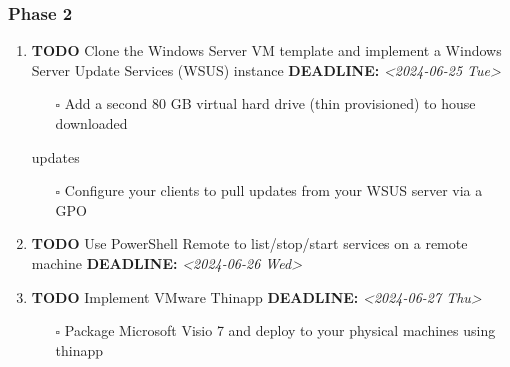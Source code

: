 \documentclass[letterpaper]{article}
\begin{document}
\subsubsection{Phase 2}
\label{sec:orge35ead0}
\begin{enumerate}
\item {\bfseries\sffamily TODO} Clone the Windows Server VM template and implement a Windows Server Update Services (WSUS) instance
\label{sec:org69bf793}
\noindent\textbf{DEADLINE:} \textit{<2024-06-25 Tue>}\\[0pt]
\begin{itemize}
\item[{$\square$}] Add a second 80 GB virtual hard drive (thin provisioned) to house downloaded
\end{itemize}
updates
\begin{itemize}
\item[{$\square$}] Configure your clients to pull updates from your WSUS server via a GPO
\end{itemize}
\item {\bfseries\sffamily TODO} Use PowerShell Remote to list/stop/start services on a remote machine
\label{sec:org5f319a4}
\noindent\textbf{DEADLINE:} \textit{<2024-06-26 Wed>}\\[0pt]
\item {\bfseries\sffamily TODO} Implement VMware Thinapp
\label{sec:org721f16e}
\noindent\textbf{DEADLINE:} \textit{<2024-06-27 Thu>}\\[0pt]
\begin{itemize}
\item[{$\square$}] Package Microsoft Visio 7 and deploy to your physical machines using thinapp
\end{itemize}
\end{enumerate}
\end{document}
